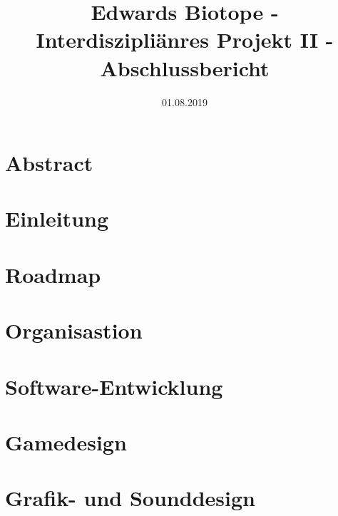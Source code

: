 \documentclass[12pt ,letterpaper]{article}
\title{Edwards Biotope - Interdiszipliänres Projekt II - Abschlussbericht}
\date{01.08.2019}
\begin{document}
\begin{onehalfspace}
\maketitle
\tableofcontents
\pagebreak
\section{Abstract}
\section{Einleitung}
\pagebreak
\section{Roadmap}

\section{Organisastion}

\section{Software-Entwicklung}



\section{Gamedesign}

\section{Grafik- und Sounddesign} 


\pagebreak

\pagebreak


\listoffigures
\end{onehalfspace}
\end{document}
